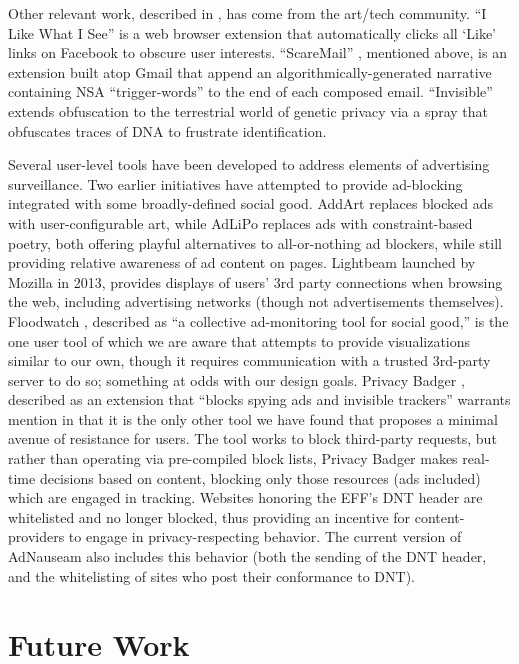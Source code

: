 \documentclass[conference]{IEEEtran}
\begin{document}
Other relevant work, described in \cite{Howe-3}, has come from the art/tech community. “I Like What I See” is a web browser extension that automatically clicks all ‘Like’ links on Facebook to obscure user interests. “ScareMail” \cite{Grosser}, mentioned above, is an extension built atop Gmail that append an algorithmically-generated narrative containing NSA “trigger-words” to the end of each composed email. “Invisible”\cite{Hagborg} extends obfuscation  to the terrestrial world of genetic privacy via a spray that obfuscates traces of DNA to frustrate identification.

Several user-level tools have been developed to address elements of advertising surveillance. Two earlier initiatives have attempted to provide ad-blocking integrated with some broadly-defined social good. AddArt \cite{AddArt} replaces blocked ads with user-configurable art, while AdLiPo \cite{Howe-0} replaces ads with constraint-based poetry, both offering playful alternatives to all-or-nothing ad blockers, while still providing relative awareness of ad content on pages. Lightbeam \cite{Mozilla} launched by Mozilla in 2013, provides displays of users' 3rd party connections when browsing the web, including advertising networks (though not advertisements themselves). Floodwatch \cite{Floodwatch}, described as “a collective ad-monitoring tool for social good,” is the one user tool of which we are aware that attempts to provide visualizations similar to our own, though it requires communication with a trusted 3rd-party server to do so; something at odds with our design goals. Privacy Badger \cite{EFF-0}, described as an extension that “blocks spying ads and invisible trackers” warrants mention in that it is the only other tool we have found that proposes a minimal avenue of resistance for users. The tool works to block third-party requests, but rather than operating via pre-compiled block lists, Privacy Badger makes real-time decisions based on content, blocking only those resources (ads included) which are engaged in tracking. Websites honoring the EFF's DNT header are whitelisted and no longer blocked, thus providing an incentive for content-providers to engage in privacy-respecting behavior. The current version of AdNauseam also includes this behavior (both the sending of the DNT header, and the whitelisting of sites who post their conformance to DNT).


\section{Future Work}
\end{document}
